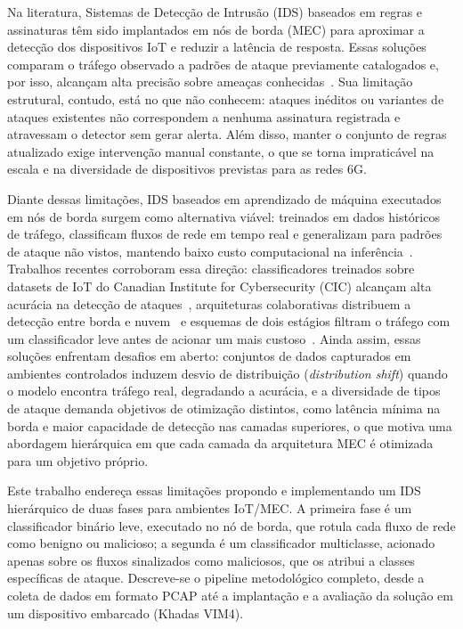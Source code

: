 \documentclass[12pt]{article}
\begin{document}
Na literatura, Sistemas de Detecção de Intrusão (IDS) baseados em regras e
assinaturas têm sido implantados em nós de borda (MEC) para aproximar a detecção
dos dispositivos IoT e reduzir a latência de resposta. Essas soluções comparam o
tráfego observado a padrões de ataque previamente catalogados e, por isso,
alcançam alta precisão sobre ameaças conhecidas~\cite{lazarevic:05}. Sua
limitação estrutural, contudo, está no que não conhecem: ataques inéditos ou
variantes de ataques existentes não correspondem a nenhuma assinatura registrada
e atravessam o detector sem gerar alerta. Além disso, manter o conjunto de
regras atualizado exige intervenção manual constante, o que se torna
impraticável na escala e na diversidade de dispositivos previstas para as redes
6G.

Diante dessas limitações, IDS baseados em aprendizado de máquina executados em
nós de borda surgem como alternativa viável: treinados em dados históricos de
tráfego, classificam fluxos de rede em tempo real e generalizam para padrões de
ataque não vistos, mantendo baixo custo computacional na
inferência~\cite{gyamfi:22}. Trabalhos recentes corroboram essa direção:
classificadores treinados sobre datasets de IoT do Canadian Institute for
Cybersecurity (CIC) alcançam alta acurácia na detecção de
ataques~\cite{houichi:25,chen:24}, arquiteturas colaborativas distribuem a
detecção entre borda e nuvem~\cite{yang:23} e esquemas de dois estágios filtram
o tráfego com um classificador leve antes de acionar um mais
custoso~\cite{aldaej:24}. Ainda assim, essas soluções enfrentam desafios em
aberto: conjuntos de dados capturados em ambientes controlados induzem desvio de
distribuição (\textit{distribution shift}) quando o modelo encontra tráfego
real, degradando a acurácia, e a diversidade de tipos de ataque demanda
objetivos de otimização distintos, como latência mínima na borda e maior
capacidade de detecção nas camadas superiores, o que motiva uma abordagem
hierárquica em que cada camada da arquitetura MEC é otimizada para um objetivo
próprio.

Este trabalho endereça essas limitações propondo e implementando um IDS
hierárquico de duas fases para ambientes IoT/MEC. A primeira fase é um
classificador binário leve, executado no nó de borda, que rotula cada fluxo de
rede como benigno ou malicioso; a segunda é um classificador multiclasse,
acionado apenas sobre os fluxos sinalizados como maliciosos, que os atribui a
classes específicas de ataque. Descreve-se o pipeline metodológico completo,
desde a coleta de dados em formato PCAP até a implantação e a avaliação da
solução em um dispositivo embarcado (Khadas VIM4).
\end{document}
